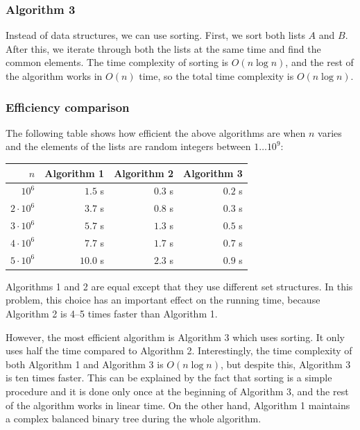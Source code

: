 \subsubsection{Algorithm 3}

Instead of data structures, we can use sorting.
First, we sort both lists $A$ and $B$.
After this, we iterate through both the lists
at the same time and find the common elements.
The time complexity of sorting is $O(n \log n)$,
and the rest of the algorithm works in $O(n)$ time,
so the total time complexity is $O(n \log n)$.

\subsubsection{Efficiency comparison}

The following table shows how efficient
the above algorithms are when $n$ varies and
the elements of the lists are random
integers between $1 \ldots 10^9$:

\begin{center}
\begin{tabular}{rrrr}
$n$ & Algorithm 1 & Algorithm 2 & Algorithm 3 \\
\hline
$10^6$ & $1.5$ s & $0.3$ s & $0.2$ s \\
$2 \cdot 10^6$ & $3.7$ s & $0.8$ s & $0.3$ s \\
$3 \cdot 10^6$ & $5.7$ s & $1.3$ s & $0.5$ s \\
$4 \cdot 10^6$ & $7.7$ s & $1.7$ s & $0.7$ s \\
$5 \cdot 10^6$ & $10.0$ s & $2.3$ s & $0.9$ s \\
\end{tabular}
\end{center}

Algorithms 1 and 2 are equal except that
they use different set structures.
In this problem, this choice has an important effect on
the running time, because Algorithm 2
is 4–5 times faster than Algorithm 1.

However, the most efficient algorithm is Algorithm 3
which uses sorting.
It only uses half the time compared to Algorithm 2.
Interestingly, the time complexity of both
Algorithm 1 and Algorithm 3 is $O(n \log n)$,
but despite this, Algorithm 3 is ten times faster.
This can be explained by the fact that
sorting is a simple procedure and it is done
only once at the beginning of Algorithm 3,
and the rest of the algorithm works in linear time.
On the other hand,
Algorithm 1 maintains a complex balanced binary tree
during the whole algorithm.
